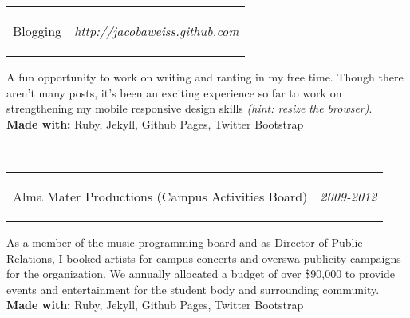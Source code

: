 \documentclass[11pt]{article}
\makeatletter
\newcommand{\headerrow}[2]
{\begin{tabular*}{\linewidth}{l@{\extracolsep{\fill}}r}
	#1 &
	#2 \\
\end{tabular*}}
\makeatother
\begin{document}
\headerrow
	{\begin{Large}Blogging\end{Large}}
	{\textit{http://jacobaweiss.github.com}}
	\begin{normalsize}
	\hspace*{1.5em}A fun opportunity to work on writing and ranting in my free time. Though there aren't many posts, it's been an exciting experience so far to work on strengthening my mobile responsive design skills {\textit{(hint: resize the browser)}}. \\
	{\bf Made with:} Ruby, Jekyll, Github Pages, Twitter Bootstrap
	\end{normalsize} \\
	
	\headerrow
	{\begin{Large}Alma Mater Productions (Campus Activities Board)\end{Large}}
	{\textit{2009-2012}}
	\begin{normalsize}
	\hspace*{1.5em}As a member of the music programming board and as Director of Public Relations, I booked artists for campus concerts and overswa publicity campaigns for the organization. We annually allocated a budget of over \$90,000 to provide events and entertainment for the student body and surrounding community. \\
	{\bf Made with:} Ruby, Jekyll, Github Pages, Twitter Bootstrap
	\end{normalsize}
\end{document}
